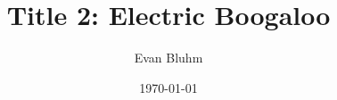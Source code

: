 \documentclass[
reprint,amsmath,amssymb,showpacs,citeautoscript,prb,twocolumn,notitlepage,floatfix
]{revtex4-1}
\begin{document}

\title{Title 2: Electric Boogaloo}

\author{Evan Bluhm}
 
\noaffiliation
\date{\today}



\maketitle
{}




\nocite{*}

\end{document}
